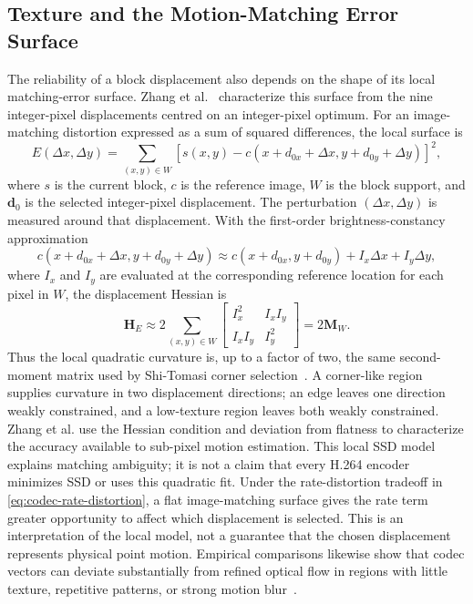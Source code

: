 \subsection{Texture and the Motion-Matching Error Surface}

The reliability of a block displacement also depends on the shape of its local
matching-error surface. Zhang et al.~\cite{zhang2010subpixel} characterize this
surface from the nine integer-pixel displacements centred on an integer-pixel
optimum. For an image-matching distortion expressed as a sum of squared
differences, the local surface is
\begin{equation}
  E(\Delta x,\Delta y)
  = \sum_{(x,y)\in W}
    \left[s(x,y)-c(x+d_{0x}+\Delta x,y+d_{0y}+\Delta y)\right]^2,
  \label{eq:mv-error-surface}
\end{equation}
where $s$ is the current block, $c$ is the reference image, $W$ is the
block support, and $\mathbf d_0$ is the selected integer-pixel displacement.
The perturbation $(\Delta x,\Delta y)$ is measured around that displacement.
With the first-order brightness-constancy approximation
\begin{equation}
  c(x+d_{0x}+\Delta x,y+d_{0y}+\Delta y)
  \approx c(x+d_{0x},y+d_{0y})+I_x\Delta x+I_y\Delta y,
\end{equation}
where $I_x$ and $I_y$ are evaluated at the corresponding reference location
for each pixel in $W$, the displacement Hessian is
\begin{equation}
  \mathbf{H}_E
  \approx 2\sum_{(x,y)\in W}
  \begin{bmatrix}
    I_x^2 & I_xI_y \\
    I_xI_y & I_y^2
  \end{bmatrix}
  =2\mathbf{M}_W.
  \label{eq:mv-error-hessian}
\end{equation}
Thus the local quadratic curvature is, up to a factor of two, the same
second-moment matrix used by Shi-Tomasi corner selection~\cite{shi1994good}.
A corner-like region supplies curvature in two displacement directions; an
edge leaves one direction weakly constrained, and a low-texture region leaves
both weakly constrained. Zhang et al. use the Hessian condition and deviation
from flatness to characterize the accuracy available to sub-pixel motion
estimation. This local SSD model explains matching ambiguity; it is not a
claim that every H.264 encoder minimizes SSD or uses this quadratic fit.
Under the rate-distortion tradeoff in \autoref{eq:codec-rate-distortion}, a
flat image-matching surface gives the rate term greater opportunity to affect
which displacement is selected. This is an interpretation of the local model,
not a guarantee that the chosen displacement represents physical point motion.
Empirical comparisons likewise show that codec vectors can deviate substantially
from refined optical flow in regions with
little texture, repetitive patterns, or strong motion
blur~\cite{hilscher2026voca}.

